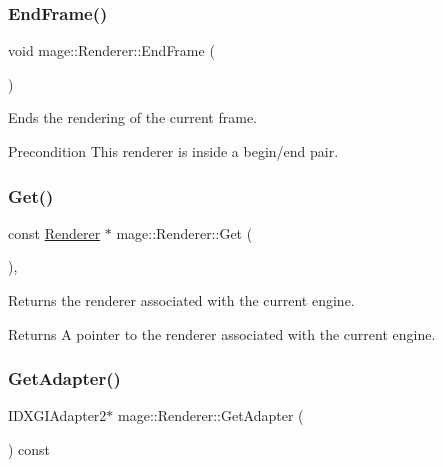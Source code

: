 \subsubsection{\texorpdfstring{End\+Frame()}{EndFrame()}}
{\footnotesize\ttfamily void mage\+::\+Renderer\+::\+End\+Frame (\begin{DoxyParamCaption}{ }\end{DoxyParamCaption})\hspace{0.3cm}{\ttfamily [noexcept]}}

Ends the rendering of the current frame.

\begin{DoxyPrecond}{Precondition}
This renderer is inside a begin/end pair. 
\end{DoxyPrecond}
\hypertarget{classmage_1_1_renderer_a84ad465ae4ecfa2c0e9334cadb82d269}{}\label{classmage_1_1_renderer_a84ad465ae4ecfa2c0e9334cadb82d269} 
\subsubsection{\texorpdfstring{Get()}{Get()}}
{\footnotesize\ttfamily const \hyperlink{classmage_1_1_renderer}{Renderer} $\ast$ mage\+::\+Renderer\+::\+Get (\begin{DoxyParamCaption}{ }\end{DoxyParamCaption})\hspace{0.3cm}{\ttfamily [static]}, {\ttfamily [noexcept]}}

Returns the renderer associated with the current engine.

\begin{DoxyReturn}{Returns}
A pointer to the renderer associated with the current engine. 
\end{DoxyReturn}
\hypertarget{classmage_1_1_renderer_a75fe0cdffda2e282dba1081dfddaa94d}{}\label{classmage_1_1_renderer_a75fe0cdffda2e282dba1081dfddaa94d} 
\subsubsection{\texorpdfstring{Get\+Adapter()}{GetAdapter()}}
{\footnotesize\ttfamily I\+D\+X\+G\+I\+Adapter2$\ast$ mage\+::\+Renderer\+::\+Get\+Adapter (\begin{DoxyParamCaption}{ }\end{DoxyParamCaption}) const\hspace{0.3cm}{\ttfamily [noexcept]}}

